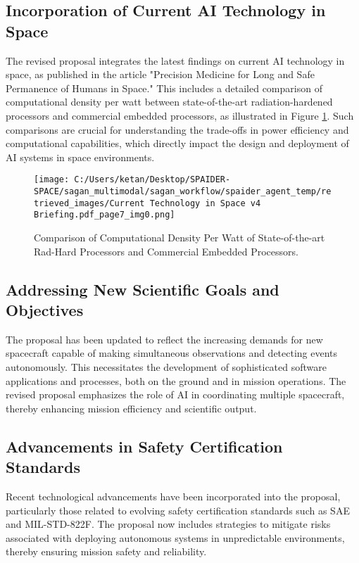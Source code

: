 \documentclass[a4paper,12pt]{article}
\begin{document}
\subsection{Incorporation of Current AI Technology in Space}

The revised proposal integrates the latest findings on current AI technology in space, as published in the article "Precision Medicine for Long and Safe Permanence of Humans in Space." This includes a detailed comparison of computational density per watt between state-of-the-art radiation-hardened processors and commercial embedded processors, as illustrated in Figure \ref{fig:comp_density}. Such comparisons are crucial for understanding the trade-offs in power efficiency and computational capabilities, which directly impact the design and deployment of AI systems in space environments.

\begin{figure}[htbp]
    \centering
    \texttt{[image: C:/Users/ketan/Desktop/SPAIDER-SPACE/sagan\_multimodal/sagan\_workflow/spaider\_agent\_temp/retrieved\_images/Current Technology in Space v4 Briefing.pdf\_page7\_img0.png]}
    \caption{Comparison of Computational Density Per Watt of State-of-the-art Rad-Hard Processors and Commercial Embedded Processors.}
    \label{fig:comp_density}
\end{figure}

\subsection{Addressing New Scientific Goals and Objectives}

The proposal has been updated to reflect the increasing demands for new spacecraft capable of making simultaneous observations and detecting events autonomously. This necessitates the development of sophisticated software applications and processes, both on the ground and in mission operations. The revised proposal emphasizes the role of AI in coordinating multiple spacecraft, thereby enhancing mission efficiency and scientific output.

\subsection{Advancements in Safety Certification Standards}

Recent technological advancements have been incorporated into the proposal, particularly those related to evolving safety certification standards such as SAE and MIL-STD-822F. The proposal now includes strategies to mitigate risks associated with deploying autonomous systems in unpredictable environments, thereby ensuring mission safety and reliability.
\end{document}
